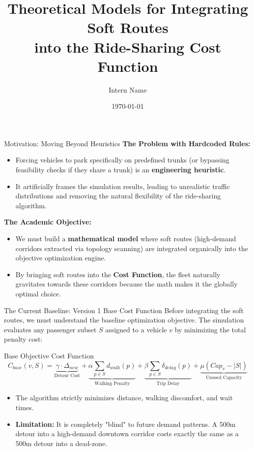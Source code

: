 \documentclass[aspectratio=169]{beamer}
\title[Soft Routes Integration]{Theoretical Models for Integrating Soft Routes\\ into the Ride-Sharing Cost Function}
\author[Intern Name]{Intern Name}
\institute[University/Lab]{University/Lab}
\date{\today}
\begin{document}
\begin{frame}
  \titlepage
\end{frame}

\begin{frame}{Motivation: Moving Beyond Heuristics}
  \textbf{The Problem with Hardcoded Rules:}
  \begin{itemize}
      \item Forcing vehicles to park specifically on predefined trunks (or bypassing feasibility checks if they share a trunk) is an \textbf{engineering heuristic}.
      \item It artificially frames the simulation results, leading to unrealistic traffic distributions and removing the natural flexibility of the ride-sharing algorithm.
  \end{itemize}
  
  \vspace{0.3cm}
  \textbf{The Academic Objective:}
  \begin{itemize}
      \item We must build a \textbf{mathematical model} where soft routes (high-demand corridors extracted via topology scanning) are integrated organically into the objective optimization engine.
      \item By bringing soft routes into the \textbf{Cost Function}, the fleet naturally gravitates towards these corridors because the math makes it the globally optimal choice.
  \end{itemize}
\end{frame}

\begin{frame}{The Current Baseline: Version 1 Base Cost Function}
  Before integrating the soft routes, we must understand the baseline optimization objective. The simulation evaluates any passenger subset $S$ assigned to a vehicle $v$ by minimizing the total penalty cost:
  
  \vspace{0.3cm}
  \begin{block}{Base Objective Cost Function}
  \[ C_{base}(v, S) = \underbrace{\gamma \cdot \Delta_{new}}_{\text{Detour Cost}} + \underbrace{\alpha \sum_{p \in S} d_{walk}(p)}_{\text{Walking Penalty}} + \underbrace{\beta \sum_{p \in S} \delta_{delay}(p)}_{\text{Trip Delay}} + \underbrace{\mu(Cap_v - |S|)}_{\text{Unused Capacity}} \]
  \end{block}
  
  \vspace{0.2cm}
  \begin{itemize}
      \item The algorithm strictly minimizes distance, walking discomfort, and wait times.
      \item \textbf{Limitation:} It is completely "blind" to future demand patterns. A 500m detour into a high-demand downtown corridor costs exactly the same as a 500m detour into a dead-zone.
  \end{itemize}
\end{frame}
\end{document}
